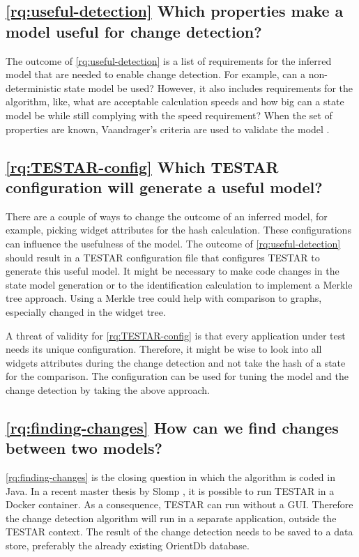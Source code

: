 \subsection{\ref{rq:useful-detection} Which properties make a model useful for change detection?}
The outcome of \ref{rq:useful-detection} is a list of requirements for the inferred model that are needed to enable change detection. For example, can a non-deterministic state model be used? However, it also includes requirements for the algorithm, like, what are acceptable calculation speeds and how big can a state model be while still complying with the speed requirement? When the set of properties are known, Vaandrager's criteria are used to validate the model \cite{vaandrager}.

\subsection{\ref{rq:TESTAR-config} Which TESTAR configuration will generate a useful model?}
There are a couple of ways to change the outcome of an inferred model, for example, picking widget attributes for the hash calculation. These configurations can influence the usefulness of the model. The outcome of \ref{rq:useful-detection} should result in a TESTAR configuration file that configures TESTAR to generate this useful model. It might be necessary to make code changes in the state model generation or to the identification calculation to implement a Merkle tree approach. Using a Merkle tree could help with comparison to graphs, especially changed in the widget tree. 

A threat of validity for \ref{rq:TESTAR-config} is that every application under test needs its unique configuration. Therefore, it might be wise to look into all widgets attributes during the change detection and not take the hash of a state for the comparison. The configuration can be used for tuning the model and the change detection by taking the above approach.

\subsection{\ref{rq:finding-changes} How can we find changes between two models?}
\ref{rq:finding-changes} is the closing question in which the algorithm is coded in Java. In a recent master thesis by Slomp \cite{thesisSlomp}, it is possible to run TESTAR in a Docker container. As a consequence, TESTAR can run without a GUI. Therefore the change detection algorithm will run in a separate application, outside the TESTAR context. The result of the change detection needs to be saved to a data store, preferably the already existing OrientDb database. 

